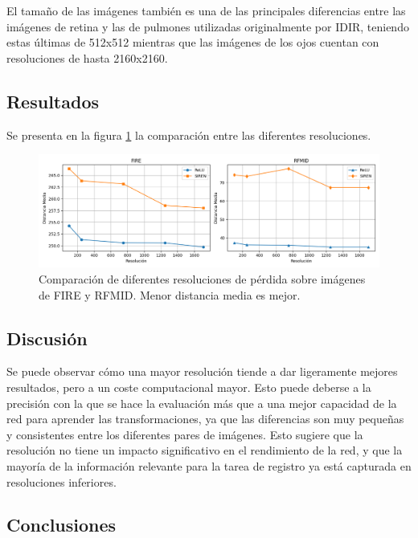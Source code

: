 El tamaño de las imágenes también es una de las principales diferencias entre las imágenes de retina y las de pulmones utilizadas originalmente por IDIR, teniendo estas últimas de 512x512 mientras que las imágenes de los ojos cuentan con resoluciones de hasta 2160x2160.

\subsection{Resultados}\label{subsec:Resultados-resolution}

Se presenta en la figura \ref{fig:resoluciónchart} la comparación entre las diferentes resoluciones.

\begin{figure}[tbp]
    \centering
    \includegraphics[width=1\textwidth]{imaxes/resolutionchart.png}
    \caption{Comparación de diferentes resoluciones de pérdida sobre imágenes de FIRE y RFMID. Menor distancia media es mejor.}
    \label{fig:resoluciónchart}
\end{figure}

\subsection{Discusión}
\label{subsec:Discusion-resolution}

Se puede observar cómo una mayor resolución tiende a dar ligeramente mejores resultados, pero a un coste computacional mayor.
Esto puede deberse a la precisión con la que se hace la evaluación más que a una mejor capacidad de la red para aprender las transformaciones, ya que las diferencias son muy pequeñas y consistentes entre los diferentes pares de imágenes.
Esto sugiere que la resolución no tiene un impacto significativo en el rendimiento de la red, y que la mayoría de la información relevante para la tarea de registro ya está capturada en resoluciones inferiores.

\subsection{Conclusiones}
\label{subsec:Conclusions-resolution}

